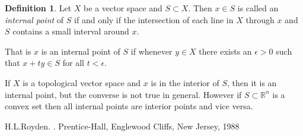 \documentclass[12pt]{article}
\theoremstyle{theorem}
\theoremstyle{definition}
\newtheorem*{defn}{Definition}
\begin{document}
\begin{defn}
Let $X$ be a vector space and $S \subset X$.  Then $x \in S$ is called an
{\em internal point} of $S$ if and only if the intersection of each line in $X$ through $x$ and $S$ contains a small interval around $x$.
\end{defn}

That is $x$ is an internal point of $S$ if whenever $y \in X$ there exists an $\epsilon > 0$ such that $x + ty \in S$ for all $t < \epsilon$.

If $X$ is a topological vector space and $x$ is in the interior of $S$, then it is an internal point, but the converse is not true in general.  However if $S \subset {\mathbb{R}}^n$ is a convex set then all internal points are interior points and vice versa.

\begin{thebibliography}{9}
H.\@ L.\@ Royden. \emph{}. Prentice-Hall, Englewood Cliffs, New Jersey, 1988
\end{thebibliography}
\end{document}
